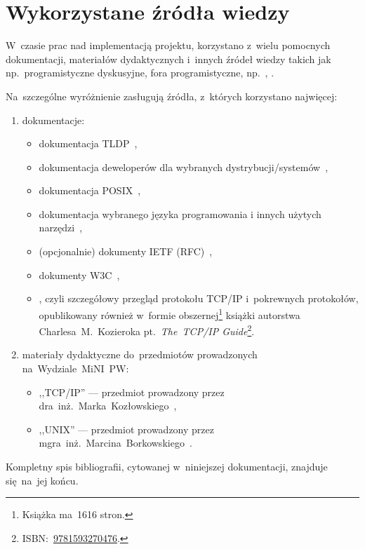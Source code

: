 \documentclass[thesis]{subfiles}
\begin{document}
\section{Wykorzystane źródła wiedzy}

W~czasie prac nad implementacją projektu, korzystano z~wielu pomocnych dokumentacji, materiałów dydaktycznych i~innych źródeł wiedzy takich jak np.~programistyczne dyskusyjne, fora programistyczne, np.~, .

\noindent Na~szczególne wyróżnienie zasługują źródła, z~których korzystano najwięcej:
\begin{enumerate}
	\item dokumentacje:
	\begin{itemize}
		\item dokumentacja TLDP~\cite{tldp},
		\item dokumentacja deweloperów dla wybranych dystrybucji/systemów~\cite{archlinux-wiki,gentoo-wiki},
		\item dokumentacja POSIX~\cite{posix},
		\item dokumentacja wybranego języka programowania i innych użytych narzędzi~\cite{glibc-doc},
		\item (opcjonalnie) dokumenty IETF (RFC)~\cite{rfc-editor},
		\item dokumenty W3C~\cite{w3c},
		\item {}, czyli szczegółowy przegląd protokołu TCP/IP i~pokrewnych protokołów, opublikowany również w~formie obszernej\footnote{Książka ma~1616 stron.} książki autorstwa \mbox{Charlesa~M.~Kozieroka} pt.~\textit{The~TCP/IP Guide}\footnote{ISBN:~\href{https://www.nostarch.com/tcpip.htm}{9781593270476}.}.
	\end{itemize}
	\item materiały dydaktyczne do~przedmiotów prowadzonych na~Wydziale~MiNI~PW:
	\begin{itemize}
		\item ,,TCP/IP'' --- przedmiot prowadzony przez dra~inż.~Marka~Kozłowskiego~\cite{kozlowski},
		\item ,,UNIX'' --- przedmiot prowadzony przez mgra~inż.~Marcina~Borkowskiego~\cite{borkowski}.
	\end{itemize}
\end{enumerate}
Kompletny spis bibliografii, cytowanej w~niniejszej dokumentacji, znajduje się~na~jej końcu.

\newpage
\end{document}

